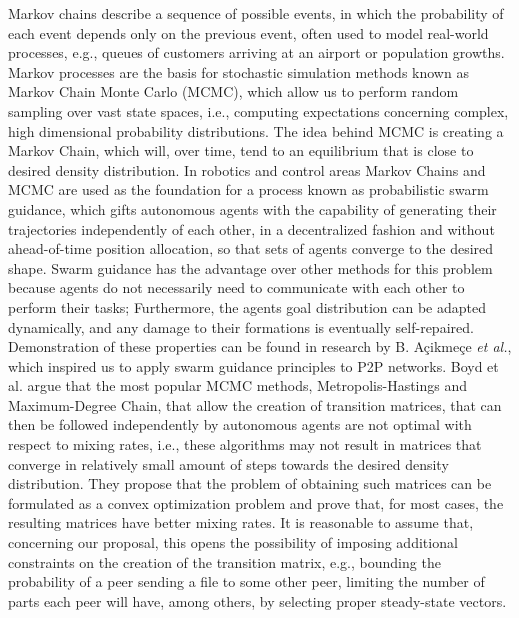 \documentclass[runningheads]{llncs}
\begin{document}
Markov chains describe a sequence of possible events, in which the probability of each event depends only on the previous event, often used to model real-world processes, e.g., queues of customers arriving at an airport or population growths. Markov processes are the basis for stochastic simulation methods known as Markov Chain Monte Carlo (MCMC), which allow us to perform random sampling over vast state spaces, i.e., computing expectations concerning complex, high dimensional probability distributions. The idea behind MCMC is creating a Markov Chain, which will, over time, tend to an equilibrium that is close to desired density distribution. In robotics and control areas Markov Chains and MCMC are used as the foundation for a process known as probabilistic swarm guidance, which gifts autonomous agents with the capability of generating their trajectories independently of each other, in a decentralized fashion and without ahead-of-time position allocation, so that sets of agents converge to the desired shape. Swarm guidance has the advantage over other methods for this problem because agents do not necessarily need to communicate with each other to perform their tasks; Furthermore, the agents goal distribution can be adapted dynamically, and any damage to their formations is eventually self-repaired. Demonstration of these properties can be found in research by B. Açikmeçe \textit{et al.}\cite{psg-mca, psg-caa}, which inspired us to apply swarm guidance principles to P2P networks. Boyd et al. \cite{fast_mixing_mc} argue that the most popular MCMC methods, Metropolis-Hastings and Maximum-Degree Chain, that allow the creation of transition matrices, that can then be followed independently by autonomous agents are not optimal with respect to mixing rates, i.e.,  these algorithms may not result in matrices that converge in relatively small amount of steps towards the desired density distribution. They propose that the problem of obtaining such matrices can be formulated as a convex optimization problem and prove that, for most cases, the resulting matrices have better mixing rates. It is reasonable to assume that, concerning our proposal, this opens the possibility of imposing additional constraints on the creation of the transition matrix, e.g., bounding the probability of a peer sending a file to some other peer, limiting the number of parts each peer will have, among others, by selecting proper steady-state vectors.

\end{document}
